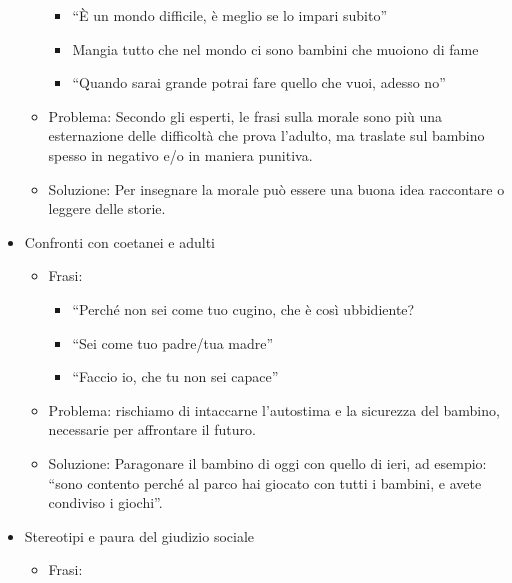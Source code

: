 \documentclass[12pt]{book} %
\begin{document}
\begin{itemize}
\begin{itemize}
\begin{itemize}
\item “È un mondo difficile, è meglio se lo impari subito”
\item {\textquotedbl}Mangia tutto che nel mondo ci sono bambini che muoiono di fame{\textquotedbl}
\item “Quando sarai grande potrai fare quello che vuoi, adesso no”
\end{itemize}
\item Problema: Secondo gli esperti, le frasi sulla morale sono più una esternazione delle difficoltà che prova
l'adulto, ma traslate sul bambino spesso in negativo e/o in maniera punitiva.
\item Soluzione: Per insegnare la morale può essere una buona idea raccontare o leggere delle storie.
\end{itemize}
\item Confronti con coetanei e adulti

\begin{itemize}
\item Frasi:

\begin{itemize}
\item “Perché non sei come tuo cugino, che è così ubbidiente?{\textquotedbl}
\item “Sei come tuo padre/tua madre”
\item “Faccio io, che tu non sei capace”
\end{itemize}
\item Problema: rischiamo di intaccarne l'autostima e la sicurezza del bambino, necessarie per
affrontare il futuro. 
\item Soluzione: Paragonare il bambino di oggi con quello di ieri, ad esempio: “sono contento perché al parco hai
giocato con tutti i bambini, e avete condiviso i giochi”.
\end{itemize}
\item Stereotipi e paura del giudizio sociale

\begin{itemize}
\item Frasi:


\end{itemize}
\end{itemize}
\end{document}
